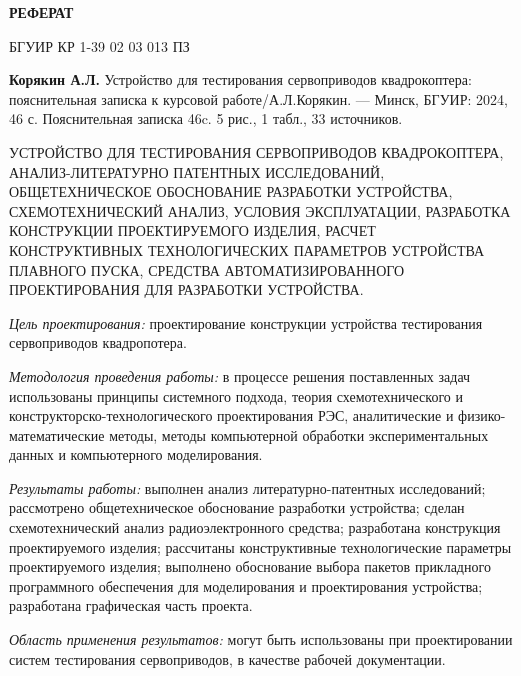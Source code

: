 \begin{center}  
\textbf{РЕФЕРАТ}
\end{center}

БГУИР КР 1-39 02 03 013 ПЗ

\textbf{Корякин А.Л.} Устройство для тестирования
сервоприводов квадрокоптера:
пояснительная записка к курсовой работе/А.Л.Корякин.
— Минск, БГУИР: 2024, 46 с.
Пояснительная записка 46c. 5 рис., 1 табл., 33 источников.

УСТРОЙСТВО ДЛЯ ТЕСТИРОВАНИЯ СЕРВОПРИВОДОВ КВАДРОКОПТЕРА,
АНАЛИЗ-ЛИТЕРАТУРНО ПАТЕНТНЫХ
ИССЛЕДОВАНИЙ, ОБЩЕТЕХНИЧЕСКОЕ ОБОСНОВАНИЕ РАЗРАБОТКИ УСТРОЙСТВА,
СХЕМОТЕХНИЧЕСКИЙ АНАЛИЗ, УСЛОВИЯ ЭКСПЛУАТАЦИИ, РАЗРАБОТКА КОНСТРУКЦИИ
ПРОЕКТИРУЕМОГО ИЗДЕЛИЯ, РАСЧЕТ КОНСТРУКТИВНЫХ ТЕХНОЛОГИЧЕСКИХ
ПАРАМЕТРОВ УСТРОЙСТВА ПЛАВНОГО ПУСКА, СРЕДСТВА АВТОМАТИЗИРОВАННОГО
ПРОЕКТИРОВАНИЯ ДЛЯ РАЗРАБОТКИ УСТРОЙСТВА.

\textit{Цель проектирования:} проектирование конструкции устройства
тестирования сервоприводов квадропотера.

\textit{Методология проведения работы:}
в процессе решения поставленных задач
использованы принципы системного подхода, теория схемотехнического и
конструкторско-технологического проектирования РЭС, аналитические и
физико-математические методы, методы компьютерной обработки
экспериментальных данных и компьютерного моделирования.

\textit{Результаты работы:}
выполнен анализ литературно-патентных исследований;
рассмотрено общетехническое обоснование разработки устройства; сделан
схемотехнический анализ радиоэлектронного средства; разработана
конструкция проектируемого изделия; рассчитаны
конструктивные технологические параметры проектируемого изделия;
выполнено обоснование выбора пакетов прикладного программного
обеспечения для моделирования и проектирования устройства; разработана
графическая часть проекта.

\textit{Область применения результатов:}
могут быть использованы при
проектировании систем тестирования сервоприводов,
в качестве рабочей документации.

\newpage

